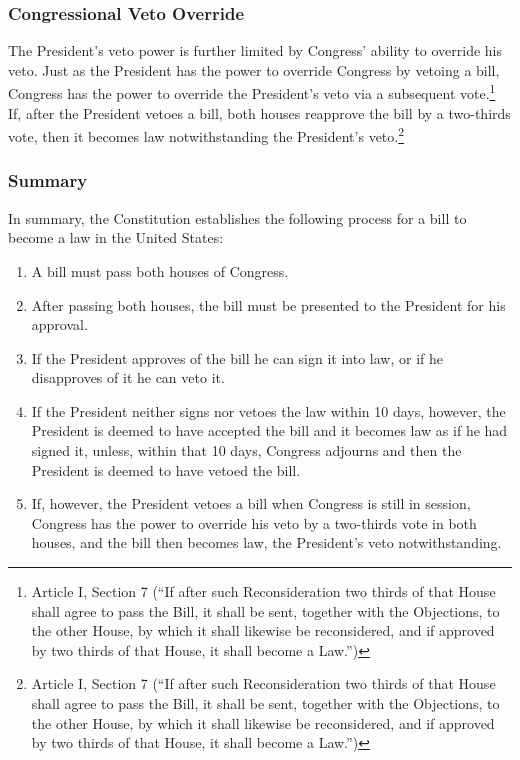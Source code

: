 \subsubsection{Congressional Veto Override}
The President's veto power is further limited by Congress' ability to override his veto.  Just as the President has the power to override Congress by vetoing a bill, Congress has the power to override the President's veto via a subsequent vote.\footnote{Article I, Section 7 (``If after such Reconsideration two thirds of that House shall agree to pass the Bill, it shall be sent, together with the Objections, to the other House, by which it shall likewise be reconsidered, and if approved by two thirds of that House, it shall become a Law.'')}
If, after the President vetoes a bill, both houses reapprove the bill by a two-thirds vote, then it becomes law notwithstanding the President's veto.\footnote{Article I, Section 7 (``If after such Reconsideration two thirds of that House shall agree to pass the Bill, it shall be sent, together with the Objections, to the other House, by which it shall likewise be reconsidered, and if approved by two thirds of that House, it shall become a Law.'')}

\subsubsection{Summary}

In summary, the Constitution establishes the following process for a bill to become a law in the United States:
\begin{enumerate}
\item A bill must pass both houses of Congress.
\item After passing both houses, the bill must be presented to the President for his approval. 
\item If the President approves of the bill he can sign it into law, or if he disapproves of it he can veto it.
\item If the President neither signs nor vetoes the law within 10 days, however, the President is deemed to have accepted the bill and it becomes law as if he had signed it, unless, within that 10 days, Congress adjourns and then the President is deemed to have vetoed the bill.
\item If, however, the President vetoes a bill when Congress is still in session, Congress has the power to override his veto by a two-thirds vote in both houses, and the bill then becomes law, the President's veto notwithstanding.
\end{enumerate}


